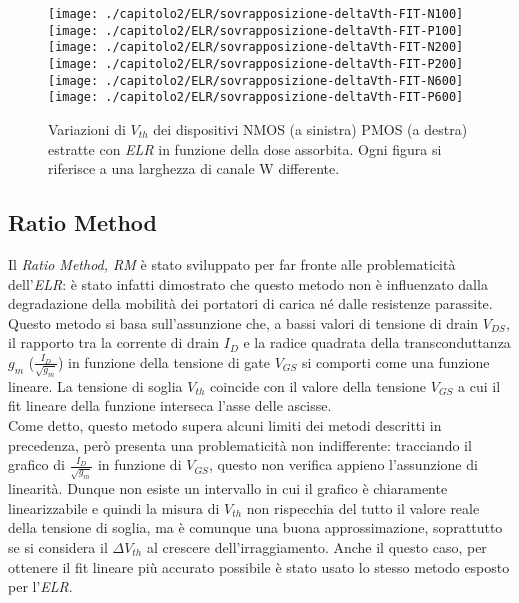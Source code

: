 \begin{figure}[H]
  \centering
  \texttt{[image: ./capitolo2/ELR/sovrapposizione-deltaVth-FIT-N100]}
  \texttt{[image: ./capitolo2/ELR/sovrapposizione-deltaVth-FIT-P100]}
  \texttt{[image: ./capitolo2/ELR/sovrapposizione-deltaVth-FIT-N200]}
  \texttt{[image: ./capitolo2/ELR/sovrapposizione-deltaVth-FIT-P200]}
  \texttt{[image: ./capitolo2/ELR/sovrapposizione-deltaVth-FIT-N600]}
  \texttt{[image: ./capitolo2/ELR/sovrapposizione-deltaVth-FIT-P600]}
  \caption{Variazioni di $V_{th}$ dei dispositivi NMOS (a sinistra) PMOS (a destra) estratte con \emph{ELR} in funzione della dose assorbita. Ogni figura si riferisce a una larghezza di canale W differente.}
\end{figure}

\subsection[RM]{Ratio Method}
Il \emph{Ratio Method, RM} è stato sviluppato per far fronte alle problematicità dell'\emph{ELR}: è stato infatti dimostrato che questo metodo non è influenzato dalla degradazione della mobilità dei portatori di carica né dalle resistenze parassite\cite{art2}. Questo metodo si basa sull'assunzione che, a bassi valori di tensione di drain $V_{DS}$, il rapporto tra la corrente di drain $I_D$ e la radice quadrata della transconduttanza $g_m$ ($\frac{I_D}{\sqrt{g_m}}$) in funzione della tensione di gate $V_{GS}$ si comporti come una funzione lineare. La tensione di soglia $V_{th}$ coincide con il valore della tensione $V_{GS}$ a cui il fit lineare della funzione interseca l'asse delle ascisse.\\
Come detto, questo metodo supera alcuni limiti dei metodi descritti in precedenza, però presenta una problematicità non indifferente: tracciando il grafico di $\frac{I_D}{\sqrt{g_m}}$ in funzione di $V_{GS}$, questo non verifica appieno l'assunzione di linearità. Dunque non esiste un intervallo in cui il grafico è chiaramente linearizzabile e quindi la misura di $V_{th}$ non rispecchia del tutto il valore reale della tensione di soglia, ma è comunque una buona approssimazione, soprattutto se si considera il $\Delta V_{th}$ al crescere dell'irraggiamento.
Anche il questo caso, per ottenere il fit lineare più accurato possibile è stato usato lo stesso metodo esposto per l'\emph{ELR}.


